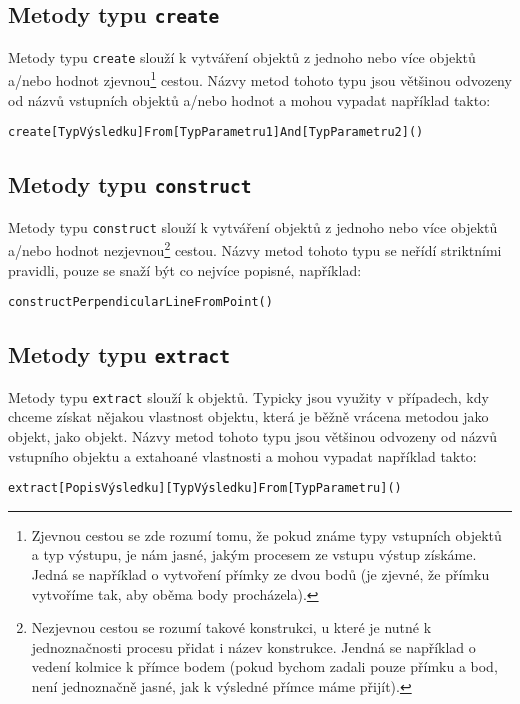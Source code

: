 \subsection[Create]{Metody typu \texttt{create}}
\label{subsec:create-methods}

Metody typu \texttt{create} slouží k vytváření objektů z jednoho nebo více objektů a/nebo hodnot zjevnou\footnote{Zjevnou cestou se zde rozumí tomu, že pokud známe typy vstupních objektů a typ výstupu, je nám jasné, jakým procesem ze vstupu výstup získáme. Jedná se například o vytvoření přímky ze dvou bodů (je zjevné, že přímku vytvoříme tak, aby oběma body procházela).} cestou.
Názvy metod tohoto typu jsou většinou odvozeny od názvů vstupních objektů a/nebo hodnot a mohou vypadat například takto: 

\texttt{create[TypVýsledku]From[TypParametru1]And[TypParametru2]()}

\subsection[Construct]{Metody typu \texttt{construct}}
\label{subsec:construct-methods}

Metody typu \texttt{construct} slouží k vytváření objektů z jednoho nebo více objektů a/nebo hodnot nezjevnou\footnote{Nezjevnou cestou se rozumí takové konstrukci, u které je nutné k jednoznačnosti procesu přidat i název konstrukce. Jendná se například o vedení kolmice k přímce bodem (pokud bychom zadali pouze přímku a bod, není jednoznačně jasné, jak k výsledné přímce máme přijít).} cestou.
Názvy metod tohoto typu se neřídí striktními pravidli, pouze se snaží být co nejvíce popisné, například:

\texttt{constructPerpendicularLineFromPoint()}

\subsection[Extract]{Metody typu \texttt{extract}}
\label{subsec:extract-methods}

Metody typu \texttt{extract} slouží k  objektů.
Typicky jsou využity v případech, kdy chceme získat nějakou vlastnost objektu, která je běžně vrácena metodou jako  objekt, jako  objekt.
Názvy metod tohoto typu jsou většinou odvozeny od názvů vstupního objektu a extahoané vlastnosti a mohou vypadat například takto:

\texttt{extract[PopisVýsledku][TypVýsledku]From[TypParametru]()}